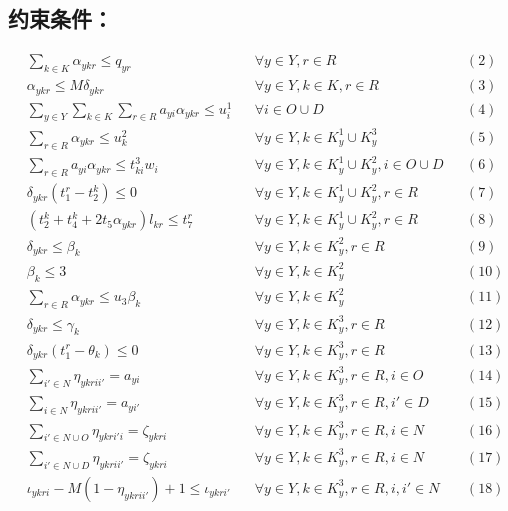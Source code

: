 \documentclass[11pt]{article}
\begin{document}
\subsection*{约束条件：}
\[
\begin{aligned}
& \sum_{k \in K} \alpha_{ykr} \leq q_{yr} && \forall y \in Y, r \in R && (2) \\
& \alpha_{ykr} \leq M \delta_{ykr} && \forall y \in Y, k \in K, r \in R && (3) \\
& \sum_{y \in Y} \sum_{k \in K} \sum_{r \in R} a_{yi} \alpha_{ykr} \leq u_i^1 && \forall i \in O \cup D && (4) \\
& \sum_{r \in R} \alpha_{ykr} \leq u_k^2 && \forall y \in Y, k \in K^1_y \cup K^3_y && (5) \\
& \sum_{r \in R} a_{yi} \alpha_{ykr} \leq t_{ki}^3 w_i && \forall y \in Y, k \in K^1_y \cup K^2_y, i \in O \cup D && (6) \\
& \delta_{ykr} (t_1^r - t_2^k) \leq 0 && \forall y \in Y, k \in K^1_y \cup K^2_y, r \in R && (7) \\
& (t_2^k + t_4^k + 2 t_5 \alpha_{ykr}) l_{kr} \leq t_7^r && \forall y \in Y, k \in K^1_y \cup K^2_y, r \in R && (8) \\
& \delta_{ykr} \leq \beta_k && \forall y \in Y, k \in K^2_y, r \in R && (9) \\
& \beta_k \leq 3 && \forall y \in Y, k \in K^2_y && (10) \\
& \sum_{r \in R} \alpha_{ykr} \leq u_3 \beta_k && \forall y \in Y, k \in K^2_y && (11) \\
& \delta_{ykr} \leq \gamma_k && \forall y \in Y, k \in K^3_y, r \in R && (12) \\
& \delta_{ykr} (t_1^r - \theta_k) \leq 0 && \forall y \in Y, k \in K^3_y, r \in R && (13) \\
& \sum_{i' \in N} \eta_{ykrii'} = a_{yi} && \forall y \in Y, k \in K^3_y, r \in R, i \in O && (14) \\
& \sum_{i \in N} \eta_{ykrii'} = a_{yi'} && \forall y \in Y, k \in K^3_y, r \in R, i' \in D && (15) \\
& \sum_{i' \in N \cup O} \eta_{ykri'i} = \zeta_{ykri} && \forall y \in Y, k \in K^3_y, r \in R, i \in N && (16) \\
& \sum_{i' \in N \cup D} \eta_{ykrii'} = \zeta_{ykri} && \forall y \in Y, k \in K^3_y, r \in R, i \in N && (17) \\
& \iota_{ykri} - M (1 - \eta_{ykrii'}) + 1 \leq \iota_{ykri'} && \forall y \in Y, k \in K^3_y, r \in R, i, i' \in N && (18) \\

\end{aligned}\]
\end{document}

